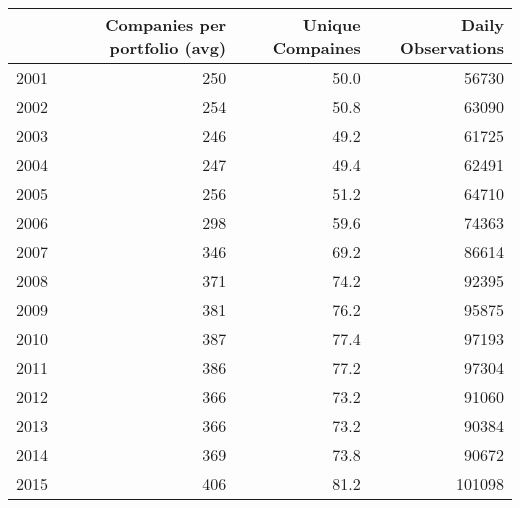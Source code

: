 \begin{table}[ht]
\centering
\begin{tabular}{rrrr}
  \hline
 & Companies per portfolio (avg) & Unique Compaines & Daily Observations \\ 
  \hline
2001 & 250 & 50.0 & 56730 \\ 
  2002 & 254 & 50.8 & 63090 \\ 
  2003 & 246 & 49.2 & 61725 \\ 
  2004 & 247 & 49.4 & 62491 \\ 
  2005 & 256 & 51.2 & 64710 \\ 
  2006 & 298 & 59.6 & 74363 \\ 
  2007 & 346 & 69.2 & 86614 \\ 
  2008 & 371 & 74.2 & 92395 \\ 
  2009 & 381 & 76.2 & 95875 \\ 
  2010 & 387 & 77.4 & 97193 \\ 
  2011 & 386 & 77.2 & 97304 \\ 
  2012 & 366 & 73.2 & 91060 \\ 
  2013 & 366 & 73.2 & 90384 \\ 
  2014 & 369 & 73.8 & 90672 \\ 
  2015 & 406 & 81.2 & 101098 \\ 
   \hline
\end{tabular}
\end{table}
